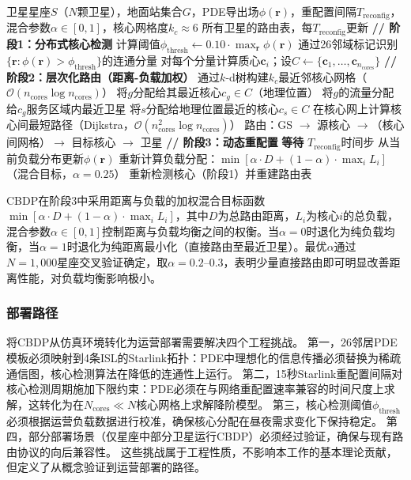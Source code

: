 \documentclass[sn-nature,pdflatex]{sn-jnl}
\begin{document}
\begin{algorithm}[htbp]
\caption{核心分布式协议（CBDP）}
\label{alg:cbdp_cn}
\begin{algorithmic}[1]
\REQUIRE 卫星星座$S$（$N$颗卫星），地面站集合$G$，PDE导出场$\phi(\mathbf{r})$，重配置间隔$T_{\text{reconfig}}$，混合参数$\alpha \in [0,1]$，核心网格度$k_c \approx 6$
\ENSURE 所有卫星的路由表，每$T_{\text{reconfig}}$更新
\STATE \textbf{// 阶段1：分布式核心检测}
\STATE 计算阈值$\phi_{\text{thresh}} \gets 0.10 \cdot \max_{\mathbf{r}} \phi(\mathbf{r})$
\STATE 通过26邻域标记识别$\{\mathbf{r} : \phi(\mathbf{r}) > \phi_{\text{thresh}}\}$的连通分量
\STATE 对每个分量计算质心$\mathbf{c}_i$；设$C \gets \{\mathbf{c}_1, \ldots, \mathbf{c}_{n_{\text{cores}}}\}$
\STATE \textbf{// 阶段2：层次化路由（距离-负载加权）}
\STATE 通过$k$-d树构建$k_c$最近邻核心网格（$\mathcal{O}(n_{\text{cores}} \log n_{\text{cores}})$）
\ENDFOR
{}
\STATE 将$g$分配给其最近核心$c_g \in C$（地理位置）
\STATE 将$g$的流量分配给$c_g$服务区域内最近卫星
\ENDFOR
{}
\STATE 将$s$分配给地理位置最近的核心$c_s \in C$
\ENDFOR
\STATE 在核心网上计算核心间最短路径（Dijkstra，$\mathcal{O}(n_{\text{cores}}^2 \log n_{\text{cores}})$）
\STATE 路由：GS $\to$ 源核心 $\to$（核心间网格）$\to$ 目标核心 $\to$ 卫星
\STATE \textbf{// 阶段3：动态重配置}
\LOOP
\STATE \textbf{等待} $T_{\text{reconfig}}$时间步
\STATE 从当前负载分布更新$\phi(\mathbf{r})$
\STATE 重新计算负载分配：$\min [\alpha \cdot D + (1-\alpha) \cdot \max_i L_i]$（混合目标，$\alpha = 0.25$）
\STATE 重新检测核心（阶段1）并重建路由表
\ENDLOOP
\end{algorithmic}
\end{algorithm}

CBDP在阶段3中采用距离与负载的加权混合目标函数$\min [\alpha \cdot D + (1-\alpha) \cdot \max_i L_i]$，其中$D$为总路由距离，$L_i$为核心$i$的总负载，混合参数$\alpha \in [0, 1]$控制距离与负载均衡之间的权衡。当$\alpha = 0$时退化为纯负载均衡，当$\alpha = 1$时退化为纯距离最小化（直接路由至最近卫星）。最优$\alpha$通过$N=1,000$星座交叉验证确定，取$\alpha = 0.2$--$0.3$，表明少量直接路由即可明显改善距离性能，对负载均衡影响极小。

\subsubsection{部署路径}

将CBDP从仿真环境转化为运营部署需要解决四个工程挑战。
第一，26邻居PDE模板必须映射到4条ISL的Starlink拓扑：PDE中理想化的信息传播必须替换为稀疏通信图，核心检测算法在降低的连通性上运行。
第二，15秒Starlink重配置间隔对核心检测周期施加下限约束：PDE必须在与网络重配置速率兼容的时间尺度上求解，这转化为在$N_{\text{cores}} \ll N$核心网格上求解降阶模型。
第三，核心检测阈值$\phi_{\text{thresh}}$必须根据运营负载数据进行校准，确保核心分配在昼夜需求变化下保持稳定。
第四，部分部署场景（仅星座中部分卫星运行CBDP）必须经过验证，确保与现有路由协议的向后兼容性。
这些挑战属于工程性质，不影响本工作的基本理论贡献，但定义了从概念验证到运营部署的路径。
\end{document}
